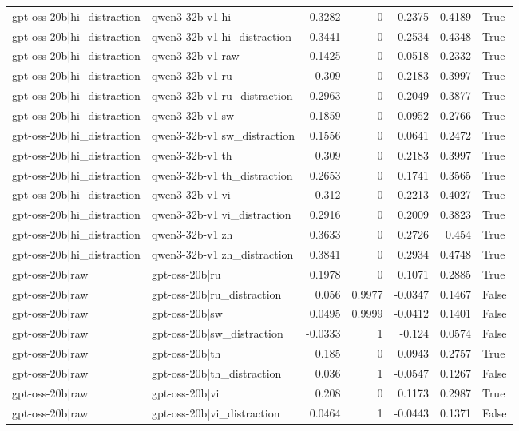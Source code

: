 \begin{table}
\begin{tabular}{l l r r r r l}
gpt-oss-20b|hi_distraction & qwen3-32b-v1|hi & 0.3282 & 0 & 0.2375 & 0.4189 & True \\
gpt-oss-20b|hi_distraction & qwen3-32b-v1|hi_distraction & 0.3441 & 0 & 0.2534 & 0.4348 & True \\
gpt-oss-20b|hi_distraction & qwen3-32b-v1|raw & 0.1425 & 0 & 0.0518 & 0.2332 & True \\
gpt-oss-20b|hi_distraction & qwen3-32b-v1|ru & 0.309 & 0 & 0.2183 & 0.3997 & True \\
gpt-oss-20b|hi_distraction & qwen3-32b-v1|ru_distraction & 0.2963 & 0 & 0.2049 & 0.3877 & True \\
gpt-oss-20b|hi_distraction & qwen3-32b-v1|sw & 0.1859 & 0 & 0.0952 & 0.2766 & True \\
gpt-oss-20b|hi_distraction & qwen3-32b-v1|sw_distraction & 0.1556 & 0 & 0.0641 & 0.2472 & True \\
gpt-oss-20b|hi_distraction & qwen3-32b-v1|th & 0.309 & 0 & 0.2183 & 0.3997 & True \\
gpt-oss-20b|hi_distraction & qwen3-32b-v1|th_distraction & 0.2653 & 0 & 0.1741 & 0.3565 & True \\
gpt-oss-20b|hi_distraction & qwen3-32b-v1|vi & 0.312 & 0 & 0.2213 & 0.4027 & True \\
gpt-oss-20b|hi_distraction & qwen3-32b-v1|vi_distraction & 0.2916 & 0 & 0.2009 & 0.3823 & True \\
gpt-oss-20b|hi_distraction & qwen3-32b-v1|zh & 0.3633 & 0 & 0.2726 & 0.454 & True \\
gpt-oss-20b|hi_distraction & qwen3-32b-v1|zh_distraction & 0.3841 & 0 & 0.2934 & 0.4748 & True \\
gpt-oss-20b|raw & gpt-oss-20b|ru & 0.1978 & 0 & 0.1071 & 0.2885 & True \\
gpt-oss-20b|raw & gpt-oss-20b|ru_distraction & 0.056 & 0.9977 & -0.0347 & 0.1467 & False \\
gpt-oss-20b|raw & gpt-oss-20b|sw & 0.0495 & 0.9999 & -0.0412 & 0.1401 & False \\
gpt-oss-20b|raw & gpt-oss-20b|sw_distraction & -0.0333 & 1 & -0.124 & 0.0574 & False \\
gpt-oss-20b|raw & gpt-oss-20b|th & 0.185 & 0 & 0.0943 & 0.2757 & True \\
gpt-oss-20b|raw & gpt-oss-20b|th_distraction & 0.036 & 1 & -0.0547 & 0.1267 & False \\
gpt-oss-20b|raw & gpt-oss-20b|vi & 0.208 & 0 & 0.1173 & 0.2987 & True \\
gpt-oss-20b|raw & gpt-oss-20b|vi_distraction & 0.0464 & 1 & -0.0443 & 0.1371 & False \\

\end{tabular}
\end{table}

